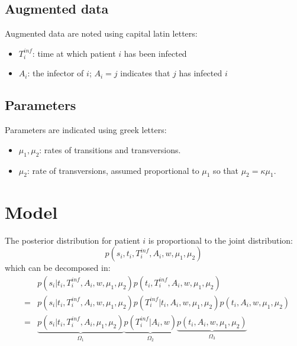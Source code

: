 \documentclass[10pt]{article}
\begin{document}
\subsection*{Augmented data}
Augmented data are noted using capital latin letters:
\begin{itemize}
	\item $T_i^{inf}$: time at which patient $i$ has been infected
	\item $A_i$: the infector of $i$; $A_i=j$ indicates that $j$ has infected $i$
\end{itemize}



\subsection*{Parameters}
Parameters are indicated using greek letters:
\begin{itemize}
	\item $\mu_1, \mu_2$: rates of transitions and transversions.
	\item $\mu_2 $: rate of transversions, assumed proportional to $\mu_1$ so that $\mu_2 = \kappa \mu_1$.
\end{itemize}






\section*{Model}

The posterior distribution for patient $i$ is proportional to the joint distribution:
\begin{equation}
 p(s_i, t_i, T_i^{inf}, A_i, w, \mu_1, \mu_2)
\end{equation}
which can be decomposed in:
\begin{eqnarray}
& & p(s_i | t_i, T_i^{inf}, A_i, w, \mu_1, \mu_2)  p(t_i, T_i^{inf}, A_i, w, \mu_1, \mu_2)\\
&=& p(s_i | t_i, T_i^{inf}, A_i, w, \mu_1, \mu_2)  p(T_i^{inf} | t_i, A_i, w, \mu_1, \mu_2) p(t_i, A_i, w, \mu_1, \mu_2)\\
&=& \underbrace{p(s_i | t_i, T_i^{inf}, A_i, \mu_1, \mu_2)}_{\Omega_1}  
    \underbrace{p(T_i^{inf} | A_i, w)}_{\Omega_2}
    \underbrace{p(t_i, A_i, w, \mu_1, \mu_2)}_{\Omega_3} 
\end{eqnarray}
\end{document}

